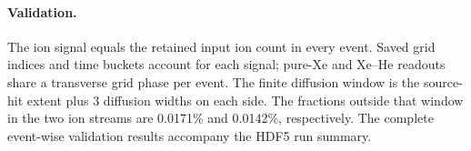 \documentclass{article}
\begin{document}
\paragraph{Validation.}
The ion signal equals the retained input ion count in every event. Saved
grid indices and time buckets account for each signal; pure-Xe and Xe--He
readouts share a transverse grid phase per event. The finite diffusion window
is the source-hit extent plus 3 diffusion widths
on each side. The fractions outside that window in the two ion streams are
0.0171\% and 0.0142\%, respectively. The complete event-wise validation results accompany
the HDF5 run summary.
\end{document}
